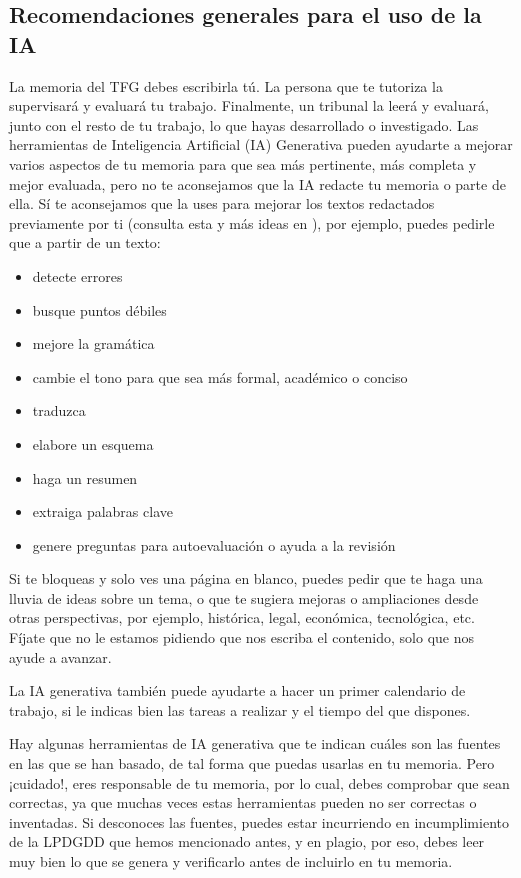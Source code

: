 \subsection{Recomendaciones generales para el uso de la IA} %
La memoria del TFG debes escribirla tú. La persona que te tutoriza la supervisará y evaluará tu trabajo. Finalmente, un tribunal la leerá y evaluará, junto con el resto de tu trabajo, lo que hayas desarrollado o investigado. Las herramientas de Inteligencia Artificial (IA) Generativa pueden ayudarte a mejorar varios aspectos de tu memoria para que sea más pertinente, más completa y mejor evaluada, pero no te aconsejamos que la IA redacte tu memoria o parte de ella. Sí te aconsejamos que la uses para mejorar los textos redactados previamente por ti (consulta esta y más ideas en \cite{IAGenerativaUNED}), por ejemplo, puedes pedirle que a partir de un texto: 
\begin{itemize}  
    \item detecte errores
    \item busque puntos débiles
    \item mejore la gramática
    \item cambie el tono para que sea más formal, académico o conciso
    \item traduzca 
    \item elabore un esquema
    \item haga un resumen
    \item extraiga palabras clave
    \item genere preguntas para autoevaluación o ayuda a la revisión 
\end{itemize} 

Si te bloqueas y solo ves una página en blanco, puedes pedir que te haga una lluvia de ideas sobre un tema, o que te sugiera mejoras o ampliaciones desde otras perspectivas, por ejemplo, histórica, legal, económica, tecnológica, etc. Fíjate que no le estamos pidiendo que nos escriba el contenido, solo que nos ayude a avanzar.

La IA generativa también puede ayudarte a hacer un primer calendario de trabajo, si le indicas bien las tareas a realizar y el tiempo del que dispones.

Hay algunas herramientas de IA generativa que te indican cuáles son las fuentes en las que se han basado, de tal forma que puedas usarlas en tu memoria. Pero ¡cuidado!, eres responsable de tu memoria, por lo cual, debes comprobar que sean correctas, ya que muchas veces estas herramientas pueden no ser correctas o inventadas. Si desconoces las fuentes, puedes estar incurriendo en incumplimiento de la LPDGDD que hemos mencionado antes, y en plagio, por eso, debes leer muy bien lo que se genera y verificarlo antes de incluirlo en tu memoria.

